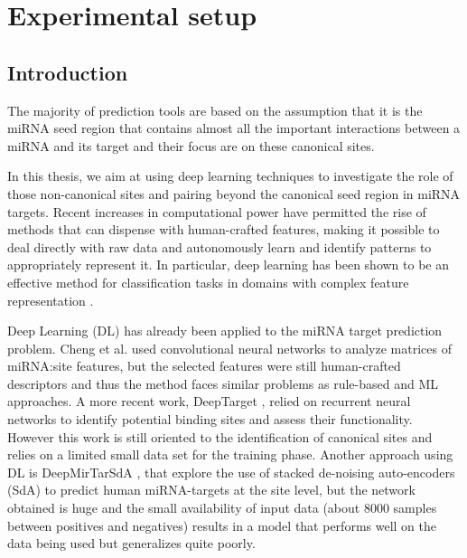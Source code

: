
\chapter{Experimental setup} %

\label{Chapter4} %



\section{Introduction}
The majority of prediction tools are based on the assumption that it is the miRNA seed region that contains almost all the important interactions between a miRNA and its target and their focus are on these canonical sites.

In this thesis, we aim at using deep learning techniques to investigate the role of those non-canonical sites and pairing beyond the canonical seed region in miRNA targets. Recent increases in computational power have permitted the rise of methods that can dispense with human-crafted features, making it possible to deal directly with raw data and autonomously learn and identify patterns to appropriately represent it. In particular, deep learning has been shown to be an effective method for classification tasks in domains with complex feature representation \cite{dl}.

Deep Learning (DL) has already been applied to the miRNA target prediction problem. Cheng et al. \cite{mirtdl} used convolutional neural networks to analyze matrices of miRNA:site features, but the selected features were still human-crafted descriptors and thus the method faces similar problems as rule-based and ML approaches. A more recent work, DeepTarget \cite{deep_target}, relied on recurrent neural networks to identify potential binding sites and assess their functionality. However this work is still oriented to the identification of canonical sites and relies on a limited small data set for the training phase. Another approach using DL is DeepMirTarSdA \cite{deep_mirtar}, that explore the use of stacked de-noising auto-encoders (SdA) to predict human miRNA-targets at the site level, but the network obtained is huge and the small availability of input data (about 8000 samples between positives and negatives) results in a model that performs well on the data being used but generalizes quite poorly. 

